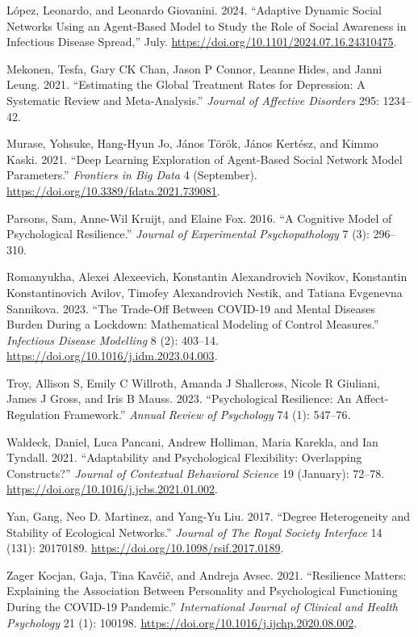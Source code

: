 \documentclass[
  letterpaper,
  DIV=11,
  numbers=noendperiod]{scrartcl}
\newlength{\cslhangindent}
\newenvironment{CSLReferences}[2] %
 {\begin{list}{}{%
  \setlength{\itemindent}{0pt}
  \setlength{\leftmargin}{0pt}
  \setlength{\parsep}{0pt}
  \ifodd #1
   \setlength{\leftmargin}{\cslhangindent}
   \setlength{\itemindent}{-1\cslhangindent}
  \fi
  \setlength{\itemsep}{#2\baselineskip}}}
 {\end{list}}
\begin{document}
\begin{CSLReferences}{1}{0}
López, Leonardo, and Leonardo Giovanini. 2024. {``Adaptive Dynamic
Social Networks Using an Agent-Based Model to Study the Role of Social
Awareness in Infectious Disease Spread,''} July.
\url{https://doi.org/10.1101/2024.07.16.24310475}.

Mekonen, Tesfa, Gary CK Chan, Jason P Connor, Leanne Hides, and Janni
Leung. 2021. {``Estimating the Global Treatment Rates for Depression: A
Systematic Review and Meta-Analysis.''} \emph{Journal of Affective
Disorders} 295: 1234--42.

Murase, Yohsuke, Hang-Hyun Jo, János Török, János Kertész, and Kimmo
Kaski. 2021. {``Deep Learning Exploration of Agent-Based Social Network
Model Parameters.''} \emph{Frontiers in Big Data} 4 (September).
\url{https://doi.org/10.3389/fdata.2021.739081}.

Parsons, Sam, Anne-Wil Kruijt, and Elaine Fox. 2016. {``A Cognitive
Model of Psychological Resilience.''} \emph{Journal of Experimental
Psychopathology} 7 (3): 296--310.

Romanyukha, Alexei Alexeevich, Konstantin Alexandrovich Novikov,
Konstantin Konstantinovich Avilov, Timofey Alexandrovich Nestik, and
Tatiana Evgenevna Sannikova. 2023. {``The Trade-Off Between COVID-19 and
Mental Diseases Burden During a Lockdown: Mathematical Modeling of
Control Measures.''} \emph{Infectious Disease Modelling} 8 (2): 403--14.
\url{https://doi.org/10.1016/j.idm.2023.04.003}.

Troy, Allison S, Emily C Willroth, Amanda J Shallcross, Nicole R
Giuliani, James J Gross, and Iris B Mauss. 2023. {``Psychological
Resilience: An Affect-Regulation Framework.''} \emph{Annual Review of
Psychology} 74 (1): 547--76.

Waldeck, Daniel, Luca Pancani, Andrew Holliman, Maria Karekla, and Ian
Tyndall. 2021. {``Adaptability and Psychological Flexibility:
Overlapping Constructs?''} \emph{Journal of Contextual Behavioral
Science} 19 (January): 72--78.
\url{https://doi.org/10.1016/j.jcbs.2021.01.002}.

Yan, Gang, Neo D. Martinez, and Yang-Yu Liu. 2017. {``Degree
Heterogeneity and Stability of Ecological Networks.''} \emph{Journal of
The Royal Society Interface} 14 (131): 20170189.
\url{https://doi.org/10.1098/rsif.2017.0189}.

Zager Kocjan, Gaja, Tina Kavčič, and Andreja Avsec. 2021. {``Resilience
Matters: Explaining the Association Between Personality and
Psychological Functioning During the COVID-19 Pandemic.''}
\emph{International Journal of Clinical and Health Psychology} 21 (1):
100198. \url{https://doi.org/10.1016/j.ijchp.2020.08.002}.

\end{CSLReferences}
\end{document}
